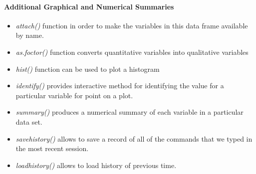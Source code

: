  \paragraph{Additional Graphical and Numerical Summaries}
 \begin{itemize}
   \item \emph{attach()} function in order to make the variables in
     this data frame available by name.
   \item \emph{as.foctor()} function converts quantitative variables
     into qualitative variables
   \item \emph{hist()} function can be used to plot a histogram
   \item \emph{identify()} provides interactive method for identifying
     the value for a particular variable for point on a plot.
   \item \emph{summary()} produces a numerical summary of each variable
     in a particular data set.
   \item \emph{savehistory()} allows to save a record of all of the
     commands that we typed in the most recent session.
   \item \emph{loadhistory()} allows to load history of previous time.
 \end{itemize}
